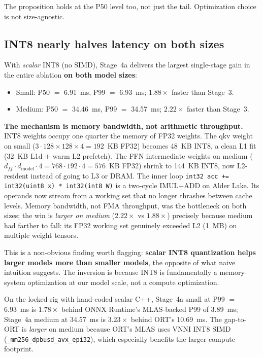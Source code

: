 \documentclass{article}
\begin{document}
The proposition holds at the P50 level too, not just the tail.
Optimization choice is not size-agnostic.

\subsection{INT8 nearly halves latency on both sizes}
\label{sec:int8}

With \emph{scalar} INT8 (no SIMD), Stage~4a delivers the largest single-stage gain in the entire ablation \textbf{on both model sizes}:
\begin{itemize}\setlength\itemsep{0.05em}
\item Small: P50 $=$ 6.91~ms, P99 $=$ 6.93~ms; $\mathbf{1.88\times}$ faster than Stage~3.
\item Medium: P50 $=$ 34.46~ms, P99 $=$ 34.57~ms; $\mathbf{2.22\times}$ faster than Stage~3.
\end{itemize}

\textbf{The mechanism is memory bandwidth, not arithmetic throughput.}
INT8 weights occupy one quarter the memory of FP32 weights.
The qkv weight on small ($3 \cdot 128 \times 128 \times 4 = 192$~KB FP32) becomes 48~KB INT8, a clean L1 fit (32~KB L1d $+$ warm L2 prefetch).
The FFN intermediate weights on medium ($d_{ff} \cdot d_\text{model} \cdot 4 = 768 \cdot 192 \cdot 4 = 576$~KB FP32) shrink to 144~KB INT8, now L2-resident instead of going to L3 or DRAM.
The inner loop \texttt{int32 acc += int32(uint8 x) * int32(int8 W)} is a two-cycle IMUL$+$ADD on Alder Lake. Its operands now stream from a working set that no longer thrashes between cache levels.
Memory bandwidth, not FMA throughput, was the bottleneck on both sizes; the win is \emph{larger on medium} ($2.22\times$ vs $1.88\times$) precisely because medium had farther to fall: its FP32 working set genuinely exceeded L2 (1~MB) on multiple weight tensors.

This is a non-obvious finding worth flagging: \textbf{scalar INT8 quantization helps larger models more than smaller models}, the opposite of what naive intuition suggests.
The inversion is because INT8 is fundamentally a memory-system optimization at our model scale, not a compute optimization.

On the locked rig with hand-coded scalar C++, Stage~4a small at P99 $=$ 6.93~ms is $1.78\times$ behind ONNX Runtime's MLAS-backed P99 of 3.89~ms; Stage~4a medium at 34.57~ms is $3.23\times$ behind ORT's 10.69~ms.
The gap-to-ORT is \emph{larger} on medium because ORT's MLAS uses VNNI INT8 SIMD (\texttt{\_mm256\_dpbusd\_avx\_epi32}), which especially benefits the larger compute footprint.
\end{document}
